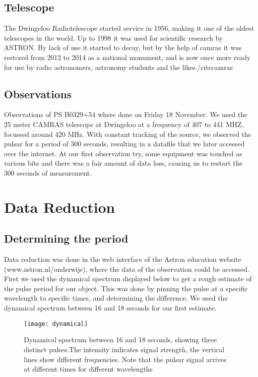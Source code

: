 \documentclass[twoside,twocolumn]{article}
\begin{document}
	\subsection{Telescope}
		The Dwingeloo Radiotelescope started service in 1956, making it one of the oldest telescopes in the world. Up to 1998 it was used for scientific research by ASTRON. By lack of use it started to decay, but by the help of camras it was restored from 2012 to 2014 as a national monument, and is now once more ready for use by radio astronomers, astronomy students and the likes./cite{camras}
	\subsection{Observations}
		Observations of PS B0329+54 where done on Friday 18 November. We used the 25 meter CAMRAS telescope at Dwingeloo at a frequency of 407 to 441 MHZ, focussed around 420 MHz. With constant tracking of the source, we observed the pulsar for a period of 300 seconds, resulting in a datafile that we later accessed over the internet. At our first observation try, some equipment was touched as various bits and there was a fair amount of data loss, causing us to restart the 300 seconds of measurement.
	
	
	\section{Data Reduction}
	\subsection{Determining the period}
	Data reduction was done in the web interface of the Astron education website (www.astron.nl/onderwijs), where the data of the observation could be accessed. 
	First we used the dynamical spectrum displayed below to get a rough estimate of the pulse period for our object. This was done by pinning the pulse at a specific wavelength to specific times, and determining the difference. We used the dynamical spectrum between 16 and 18 seconds for our first estimate.

	\begin{figure}[h]
	\centering
	\texttt{[image: dynamical]}
	\caption{Dynamical spectrum between 16 and 18 seconds, showing three distinct pulses.The intensity indicates signal strength, the vertical lines show different frequencies. Note that the pulsar signal arrives at different times for different wavelengths}
	\label{Figure 1}
	\end{figure}
	
\end{document}
